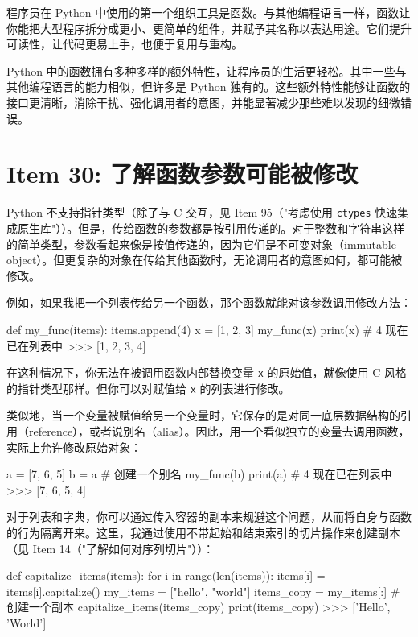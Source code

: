 程序员在 Python 中使用的第一个组织工具是函数。与其他编程语言一样，函数让你能把大型程序拆分成更小、更简单的组件，并赋予其名称以表达用途。它们提升可读性，让代码更易上手，也便于复用与重构。

Python 中的函数拥有多种多样的额外特性，让程序员的生活更轻松。其中一些与其他编程语言的能力相似，但许多是 Python 独有的。这些额外特性能够让函数的接口更清晰，消除干扰、强化调用者的意图，并能显著减少那些难以发现的细微错误。

\section{Item 30: 了解函数参数可能被修改}

Python 不支持指针类型（除了与 C 交互，见 Item 95（"考虑使用 \texttt{ctypes} 快速集成原生库"））。但是，传给函数的参数都是按引用传递的。对于整数和字符串这样的简单类型，参数看起来像是按值传递的，因为它们是不可变对象（immutable object）。但更复杂的对象在传给其他函数时，无论调用者的意图如何，都可能被修改。

例如，如果我把一个列表传给另一个函数，那个函数就能对该参数调用修改方法：

\begin{codebox}[python]
def my_func(items):
    items.append(4)
x = [1, 2, 3]
my_func(x)
print(x)  # 4 现在已在列表中
>>>
[1, 2, 3, 4]
\end{codebox}

在这种情况下，你无法在被调用函数内部替换变量 \texttt{x} 的原始值，就像使用 C 风格的指针类型那样。但你可以对赋值给 \texttt{x} 的列表进行修改。

类似地，当一个变量被赋值给另一个变量时，它保存的是对同一底层数据结构的引用（reference），或者说别名（alias）。因此，用一个看似独立的变量去调用函数，实际上允许修改原始对象：

\begin{codebox}[python]
a = [7, 6, 5]
b = a          # 创建一个别名
my_func(b)
print(a)       # 4 现在已在列表中
>>>
[7, 6, 5, 4]
\end{codebox}

对于列表和字典，你可以通过传入容器的副本来规避这个问题，从而将自身与函数的行为隔离开来。这里，我通过使用不带起始和结束索引的切片操作来创建副本（见 Item 14（"了解如何对序列切片"））：

\begin{codebox}[python]
def capitalize_items(items):
    for i in range(len(items)):
        items[i] = items[i].capitalize()
my_items = ["hello", "world"]
items_copy = my_items[:]  # 创建一个副本
capitalize_items(items_copy)
print(items_copy)
>>>
['Hello', 'World']
\end{codebox}

